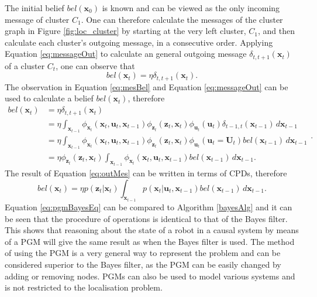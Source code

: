 \documentclass[12pt,oneside,openany,a4paper, %
afrikaans,english,
]{memoir}
\numberwithin{equation}{chapter}
\begin{document}
The initial belief $bel(\bm{x}_0)$ is known and can be viewed as the only incoming message of cluster $C_1$. One can therefore calculate the messages of the cluster graph in Figure \ref{fig:loc_cluster} by starting at the very left cluster, $C_1$, and then calculate each cluster's outgoing message, in a consecutive order.
Applying Equation \ref{eq:messageOut} to calculate an general outgoing message $\delta_{t,t+1}(\bm{x}_t)$ of a cluster $C_t$, one can observe that
\begin{equation}\label{eq:mesBel}
bel(\bm{x}_t) = \eta\delta_{t,t+1}(\bm{x}_t).
\end{equation}
The observation in Equation \ref{eq:mesBel} and Equation \ref{eq:messageOut} can be used to calculate a belief $bel(\bm{x}_t)$, therefore
\begin{equation}\label{eq:outMes}
\begin{split}
bel(\bm{x}_t) & = \eta \delta_{t,t+1}(\bm{x}_t)\\
& = \eta \int_{\bm{x}_{t-1}}\phi_{\bm{x}_t}(\bm{x}_t,\bm{u}_t,\bm{x}_{t-1})\phi_{\bm{z}_t}(\bm{z}_t,\bm{x}_t)\phi_{\bm{u}_t}(\bm{u}_t)\delta_{t-1,t}(\bm{x}_{t-1})\,d\bm{x}_{t-1}\\
& = \eta \int_{\bm{x}_{t-1}}\phi_{\bm{x}_t}(\bm{x}_t,\bm{u}_t,\bm{x}_{t-1})\phi_{\bm{z}_t}(\bm{z}_t,\bm{x}_t)\phi_{\bm{u}_t}(\bm{u}_t =\bm{U}_t)bel(\bm{x}_{t-1})\,d\bm{x}_{t-1}\\
& = \eta \phi_{\bm{z}_t}(\bm{z}_t,\bm{x}_t)\int_{\bm{x}_{t-1}}\phi_{\bm{x}_t}(\bm{x}_t,\bm{u}_t,\bm{x}_{t-1})bel(\bm{x}_{t-1})\,d\bm{x}_{t-1}.
\end{split}.
\end{equation}
The result of Equation \ref{eq:outMes} can be written in terms of CPDs, therefore
\begin{equation}\label{eq:pgmBayesEq}
bel(\bm{x}_t) = \eta p(\bm{z}_t|\bm{x}_t)\int_{\bm{x}_{t-1}}p(\bm{x}_t|\bm{u}_t,\bm{x}_{t-1})bel(\bm{x}_{t-1})\,d\bm{x}_{t-1}.
\end{equation}
Equation \ref{eq:pgmBayesEq} can be compared to Algorithm \ref{bayesAlg} and it can be seen that the procedure of operations is identical to that of the Bayes filter. This shows that reasoning about the state of a robot in a causal system by means of a PGM will give the same result as when the Bayes filter is used. The method of using the PGM is a very general way to represent the problem and can be considered superior to the Bayes filter, as the PGM can be easily changed by adding or removing nodes. PGMs can also be used to model various systems and is not restricted to the localisation problem.
\end{document}
